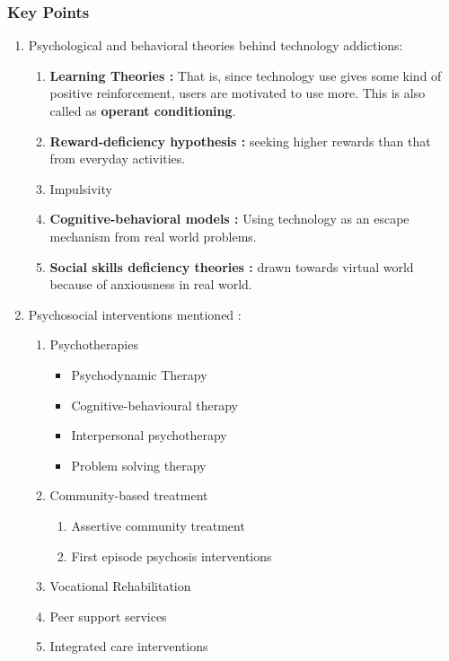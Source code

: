 \documentclass{article}
\begin{document}
\subsubsection{Key Points}
\begin{enumerate}
    \item Psychological and behavioral theories behind technology addictions: 
    \begin{enumerate}
        \item \textbf{Learning Theories :} That is, since technology use gives some kind of positive reinforcement, users are motivated to use more. This is also called as \textbf{operant conditioning}.
        \item \textbf{Reward-deficiency hypothesis :} seeking higher rewards than that from everyday activities.
        \item Impulsivity
        \item \textbf{Cognitive-behavioral models :} Using technology as an escape mechanism from real world problems.
        \item \textbf{Social skills deficiency theories :} drawn towards virtual world because of anxiousness in real world.
    \end{enumerate}
    \item Psychosocial interventions mentioned : 
    \begin{enumerate}
        \item Psychotherapies
        \begin{itemize}
            \item Psychodynamic Therapy
            \item Cognitive-behavioural therapy
            \item Interpersonal psychotherapy
            \item Problem solving therapy
        \end{itemize}
        \item Community-based treatment
        \begin{enumerate}
            \item Assertive community treatment
            \item First episode psychosis interventions
        \end{enumerate}
        \item Vocational Rehabilitation
        \item Peer support services
        \item Integrated care interventions
    \end{enumerate}

\end{enumerate}
\end{document}
